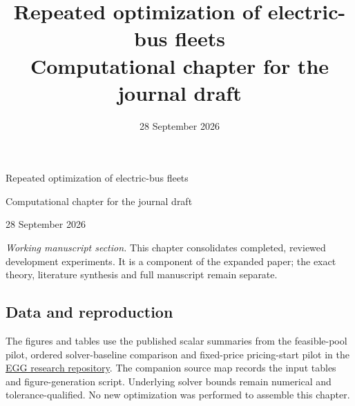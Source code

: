\documentclass[11pt]{article}
\title{Repeated optimization of electric-bus fleets\\[0.35em]
\large Computational chapter for the journal draft}
\author{}
\date{28 September 2026}
\let\originalsubsection\subsection
\renewcommand{\subsection}{\FloatBarrier\originalsubsection}
\begin{document}
\begin{center}
{\LARGE Repeated optimization of electric-bus fleets\par}
\vspace{0.5em}
{\large Computational chapter for the journal draft\par}
\vspace{0.5em}
28 September 2026
\end{center}
\vspace{0.75em}
\noindent\textit{Working manuscript section.} This chapter consolidates completed,
reviewed development experiments. It is a component of the expanded paper;
the exact theory, literature synthesis and full manuscript remain separate.

\FloatBarrier
\subsection*{Data and reproduction}
The figures and tables use the published scalar summaries from the feasible-pool
pilot, ordered solver-baseline comparison and fixed-price pricing-start pilot
in the \href{https://github.com/ndandnd/egg}{EGG research repository}.
The companion source map records the input tables and figure-generation script.
Underlying solver bounds remain numerical and tolerance-qualified. No new
optimization was performed to assemble this chapter.
\end{document}

